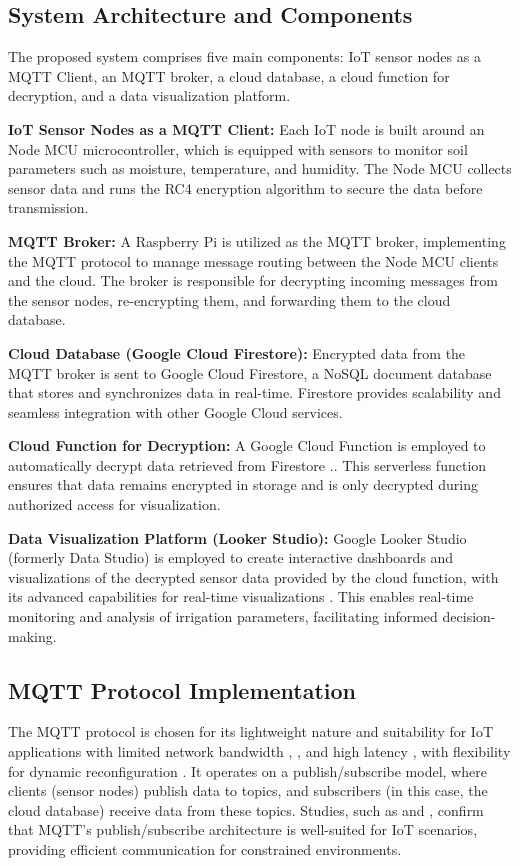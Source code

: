 \documentclass[conference]{IEEEtran}
\begin{document}
\subsection{System Architecture and Components}

The proposed system comprises five main components: IoT sensor nodes as a MQTT Client, an MQTT broker, a cloud database, a cloud function for decryption, and a data visualization platform.

\textbf{IoT Sensor Nodes as a MQTT Client:} Each IoT node is built around an Node MCU microcontroller, which is equipped with sensors to monitor soil parameters such as moisture, temperature, and humidity. The Node MCU collects sensor data and runs the RC4 encryption algorithm to secure the data before transmission.

\textbf{MQTT Broker:} A Raspberry Pi is utilized as the MQTT broker, implementing the MQTT protocol to manage message routing between the Node MCU clients and the cloud. The broker is responsible for decrypting incoming messages from the sensor nodes, re-encrypting them, and forwarding them to the cloud database.

\textbf{Cloud Database (Google Cloud Firestore):} Encrypted data from the MQTT broker is sent to Google Cloud Firestore, a NoSQL document database that stores and synchronizes data in real-time. Firestore provides scalability and seamless integration with other Google Cloud services.

\textbf{Cloud Function for Decryption:} A Google Cloud Function is employed to automatically decrypt data retrieved from Firestore \cite{ref18}.. This serverless function ensures that data remains encrypted in storage and is only decrypted during authorized access for visualization.

\textbf{Data Visualization Platform (Looker Studio):} Google Looker Studio (formerly Data Studio) is employed to create interactive dashboards and visualizations of the decrypted sensor data provided by the cloud function, with its advanced capabilities for real-time visualizations \cite{ref15}. This enables real-time monitoring and analysis of irrigation parameters, facilitating informed decision-making.

\subsection{MQTT Protocol Implementation}

The MQTT protocol is chosen for its lightweight nature and suitability for IoT applications with limited network bandwidth \cite{ref5}, \cite{ref11}, \cite{ref16} and high latency , with flexibility for dynamic reconfiguration \cite{ref12}. It operates on a publish/subscribe model, where clients (sensor nodes) publish data to topics, and subscribers (in this case, the cloud database) receive data from these topics.
Studies, such as \cite{ref5} and \cite{ref11}, confirm that MQTT’s publish/subscribe architecture is well-suited for IoT scenarios, providing efficient communication for constrained environments.
\end{document}
